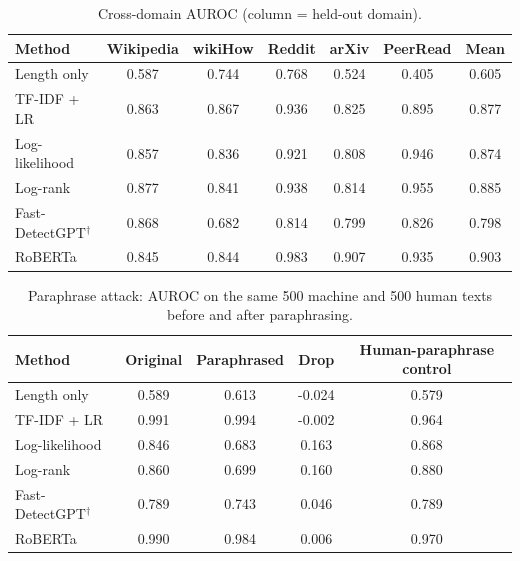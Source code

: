 \documentclass[11pt,a4paper]{article}
\begin{document}
\begin{table}
  \caption{Cross-domain AUROC (column = held-out domain).}
  \begin{tabular}{lcccccc}
  \hline\hline
  Method & Wikipedia & wikiHow & Reddit & arXiv & PeerRead & Mean \\
  \hline
  Length only                & 0.587 & 0.744 & 0.768 & 0.524 & 0.405 & 0.605 \\
  TF-IDF + LR                & 0.863 & 0.867 & 0.936 & 0.825 & 0.895 & 0.877 \\
  Log-likelihood             & 0.857 & 0.836 & 0.921 & 0.808 & 0.946 & 0.874 \\
  Log-rank                   & 0.877 & 0.841 & 0.938 & 0.814 & 0.955 & 0.885 \\
  Fast-DetectGPT$^\dagger$   & 0.868 & 0.682 & 0.814 & 0.799 & 0.826 & 0.798 \\
  RoBERTa                    & 0.845 & 0.844 & 0.983 & 0.907 & 0.935 & 0.903 \\
  \hline\hline
  \end{tabular}
  \label{tab:xdomain}
\end{table}

\begin{table}
  \caption{Paraphrase attack: AUROC on the same 500 machine and 500 human texts before and after paraphrasing.}
  \begin{tabular}{lcccc}
  \hline\hline
  Method & Original & Paraphrased & Drop & Human-paraphrase control \\
  \hline
  Length only                & 0.589 & 0.613 & -0.024 & 0.579 \\
  TF-IDF + LR                & 0.991 & 0.994 & -0.002 & 0.964 \\
  Log-likelihood             & 0.846 & 0.683 & 0.163 & 0.868 \\
  Log-rank                   & 0.860 & 0.699 & 0.160 & 0.880 \\
  Fast-DetectGPT$^\dagger$   & 0.789 & 0.743 & 0.046 & 0.789 \\
  RoBERTa                    & 0.990 & 0.984 & 0.006 & 0.970 \\
  \hline\hline
  \end{tabular}
  \label{tab:para}
\end{table}
\end{document}
